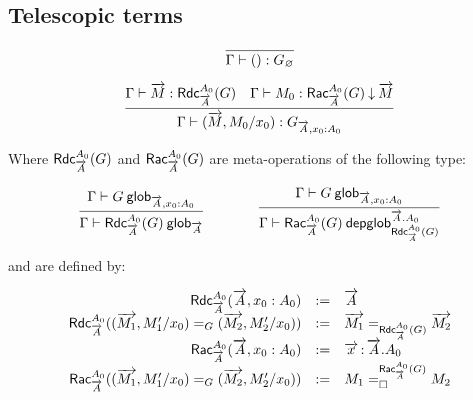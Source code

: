 \subsection{Telescopic terms}

\begin{small}
  \[
  \infer{\ofglob{\Gamma}{()}{G_\varnothing}}{}
  \]

  \[
  \infer{\ofglob{\Gamma}{(\tel{M},M_0/x_0)}{G_{\tel A,x_0:A_0}}}
  {\ofglob{\Gamma}{\tel M}{\fsttelglob{\tel A}{A_0}{G}}
    & \ofdepglob{\Gamma}{M_0}{\sndtelglob{\tel A}{A_0}{G}}{\tel M}}
  \]
\end{small}

Where $\fsttelglob{\tel A}{A_0}{G}$ and $\sndtelglob{\tel A}{A_0}{G}$ are
meta-operations of the following type:

\begin{small}
  \[
  \infer
    {\wfglob{\Gamma}{\fsttelglob{\tel A}{A_0}{G}}{\tel A}}
    {\wfglob{\Gamma}{G}{\tel A,x_0:A_0}}
  \qquad\qquad
  \infer
    {\wfdepglob{\Gamma}{\sndtelglob{\tel A}{A_0}{G}}
      {\tel A.A_0}{\fsttelglob{\tel A}{A_0}{G}}}
    {\wfglob{\Gamma}{G}{\tel A,x_0:A_0}}
  \]
\end{small}

and are defined by:

\begin{small}
  \[
  \begin{array}{rcl}
    \fsttelglob{\tel A}{A_0}{\tel A,x_0:A_0} & := & \tel A \\
    \fsttelglob{\tel A}{A_0}{\homj{G}{(\tel{M_1},M_1'/x_0)}
      {(\tel{M_2},M_2'/x_0)}} & := &
      \homj{\fsttelglob{\tel A}{A_0}{G}}{\tel{M_1}}{\tel{M_2}} \\
    \sndtelglob{\tel A}{A_0}{\tel A,x_0:A_0} & := & \teltm xA.A_0 \\
    \sndtelglob{\tel A}{A_0}{\homj{G}{(\tel{M_1},M_1'/x_0)}
      {(\tel{M_2},M_2'/x_0)}} & := &
      \dhomj{\sndtelglob{\tel A}{A_0}{G}}{M_1}{M_2}{\blank}
    \\
  \end{array}
  \]
\end{small}

